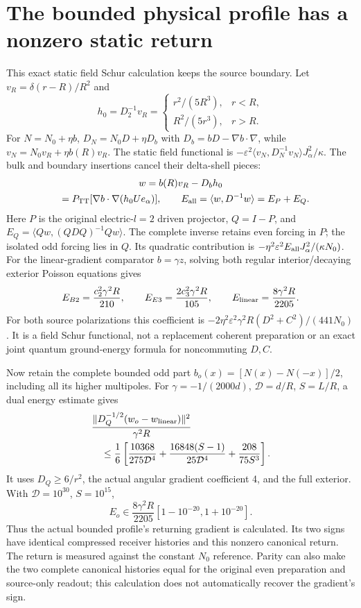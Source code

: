 \section{The bounded physical profile has a nonzero static return}
This exact static field Schur calculation keeps the source boundary.
Let $v_R=\delta(r-R)/R^2$ and
\[
 h_0=D_2^{-1}v_R=
 \begin{cases}r^2/(5R^3),&r<R,\\R^2/(5r^3),&r>R.\end{cases}
\]
For $N=N_0+\eta b$, $D_N=N_0D+\eta D_b$ with
$D_b=bD-\nabla b\cdot\nabla$, while $v_N=N_0v_R+\eta b(R)v_R$.
The static field functional is
$-\varepsilon^2\langle v_N,D_N^{-1}v_N\rangle J_\alpha^2/\kappa$.
The bulk and boundary insertions cancel their delta-shell pieces:
\[
 \begin{gathered}
 w=b(R)v_R-D_bh_0\\
 \hphantom{w}=P_{\rm TT}[\nabla b\cdot\nabla(h_0Ue_\alpha)],\qquad
 E_{\rm all}=\langle w,D^{-1}w\rangle=E_P+E_Q.
 \end{gathered}
\]
Here $P$ is the original electric-$l=2$ driven projector, $Q=I-P$, and $E_Q=\langle Qw,(QDQ)^{-1}Qw\rangle$. The complete inverse retains even forcing in $P$; the isolated odd forcing lies in $Q$. Its quadratic contribution is
$-\eta^2\varepsilon^2 E_{\rm all}J_\alpha^2/(\kappa N_0)$.
For the linear-gradient comparator $b=\gamma z$, solving both regular
interior/decaying exterior Poisson equations gives
\[
 E_{B2}=\frac{c_2^2\gamma^2R}{210},\qquad
 E_{E3}=\frac{2c_3^2\gamma^2R}{105},\qquad
 E_{\rm linear}=\frac{8\gamma^2R}{2205}.
\]
For both source polarizations this coefficient is
$-2\eta^2\varepsilon^2\gamma^2R(D^2+C^2)/(441N_0)$.
It is a field Schur functional, not a replacement coherent preparation or
an exact joint quantum ground-energy formula for noncommuting $D,C$.

Now retain the complete bounded odd part
$b_o(x)=[N(x)-N(-x)]/2$, including all its higher multipoles.
For $\gamma=-1/(2000d)$, $\mathcal D=d/R$, $S=L/R$, a dual energy estimate gives
\[
 \begin{aligned}
 &\frac{\|D_Q^{-1/2}(w_o-w_{\rm linear})\|^2}{\gamma^2R}\\
 &\quad\le\frac 16\left[\frac{10368}{275\mathcal D^4}
       +\frac{16848(S-1)}{25\mathcal D^4}+\frac{208}{75S^3}\right].
 \end{aligned}
\]
It uses $D_Q\ge 6/r^2$, the actual angular gradient coefficient 4, and
the full exterior. With $\mathcal D=10^{30}$, $S=10^{15}$,
\[
 E_o\in\frac{8\gamma^2R}{2205}[1-10^{-20},1+10^{-20}].
\]
Thus the actual bounded profile's returning gradient is calculated.
Its two signs have identical compressed receiver histories and this
nonzero canonical return.
The return is measured against the constant $N_0$ reference. Parity can
also make the two complete canonical histories equal for the original
even preparation and source-only readout; this calculation does not
automatically recover the gradient's sign.

